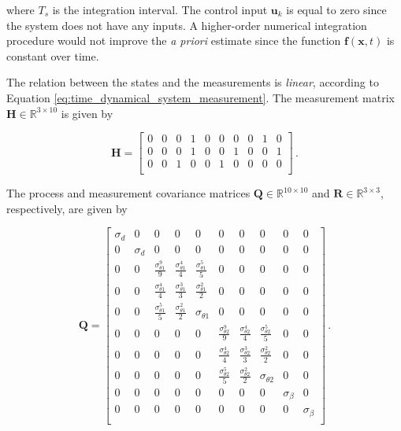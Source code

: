\noindent
where $T_s$ is the integration interval. The control input $\mathbf{u}_k$ is equal to zero since the system does not have any inputs. A higher-order numerical integration procedure would not improve the \emph{a priori} estimate since the function $\mathbf{f}(\mathbf{x}, t)$ is constant over time.

The relation between the states and the measurements is \emph{linear}, according to Equation \ref{eq:time_dynamical_system_measurement}. The measurement matrix $\mathbf{H} \in \mathbb{R}^{3 \times 10}$ is given by 

\begin{equation}
\mathbf{H} = \begin{bmatrix}
  0 & 0 & 0 & 1 & 0 & 0 & 0 & 0 & 1 & 0\\
  0 & 0 & 0 & 1 & 0 & 0 & 1 & 0 & 0 & 1\\
  0 & 0 & 1 & 0 & 0 & 1 & 0 & 0 & 0 & 0\\
\end{bmatrix}\,.
\end{equation}

The process and measurement covariance matrices $\mathbf{Q} \in \mathbb{R}^{10 \times 10}$ and $\mathbf{R} \in \mathbb{R}^{3 \times 3}$, respectively, are given by

\begin{equation}
\mathbf{Q} = \begin{bmatrix}
  \sigma_d & 0 & 0 & 0 & 0 & 0 & 0 & 0 & 0 & 0\\
  0 & \sigma_d & 0 & 0 & 0 & 0 & 0 & 0 & 0 & 0\\
  0 & 0 & \frac{\sigma^9_{\theta 1}}{9} & \frac{\sigma^4_{\theta 1}}{4} & \frac{\sigma^5_{\theta 1}}{5} & 0 & 0 & 0 & 0 & 0\\
  0 & 0 & \frac{\sigma^4_{\theta 1}}{4} & \frac{\sigma^3_{\theta 1}}{3} & \frac{\sigma^2_{\theta 1}}{2} & 0 & 0 & 0 & 0 & 0\\
  0 & 0 & \frac{\sigma^5_{\theta 1}}{5} & \frac{\sigma^2_{\theta 1}}{2} & \sigma_{\theta 1} & 0 & 0 & 0 & 0 & 0\\
  0 & 0 & 0 & 0 & 0 & \frac{\sigma^9_{\theta 2}}{9} & \frac{\sigma^4_{\theta 2}}{4} & \frac{\sigma^5_{\theta 2}}{5} & 0 & 0\\
  0 & 0 & 0 & 0 & 0 & \frac{\sigma^4_{\theta 2}}{4} & \frac{\sigma^3_{\theta 2}}{3} & \frac{\sigma^2_{\theta 2}}{2} & 0 & 0\\
  0 & 0 & 0 & 0 & 0 & \frac{\sigma^5_{\theta 2}}{5} & \frac{\sigma^2_{\theta 2}}{2} & \sigma_{\theta 2} & 0 & 0\\
  0 & 0 & 0 & 0 & 0 & 0 & 0 & 0 & \sigma_{\beta} & 0\\
  0 & 0 & 0 & 0 & 0 & 0 & 0 & 0 & 0 & \sigma_{\beta}\\
\end{bmatrix}\,.
\end{equation}

